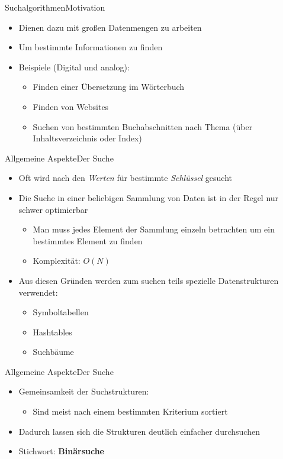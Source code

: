 \begin{frame}{Suchalgorithmen}{Motivation}
    \begin{itemize}
        \item Dienen dazu mit großen Datenmengen zu arbeiten
        \item Um bestimmte Informationen zu finden
        \item Beispiele (Digital und analog):
        \begin{itemize}
            \item Finden einer Übersetzung im Wörterbuch 
            \item Finden von Websites
            \item Suchen von bestimmten Buchabschnitten nach Thema (über Inhaltsverzeichnis oder Index)
        \end{itemize}
    \end{itemize}
\end{frame}

\begin{frame}{Allgemeine Aspekte}{Der Suche}
    \begin{itemize}
        \item Oft wird nach den \textit{Werten} für bestimmte \textit{Schlüssel} gesucht
        \item Die Suche in einer beliebigen Sammlung von Daten ist in der Regel nur schwer optimierbar
        \begin{itemize}
            \item Man muss jedes Element der Sammlung einzeln betrachten um ein bestimmtes Element zu finden
            \item Komplexität: $O(N)$
        \end{itemize}
        \item Aus diesen Gründen werden zum suchen teils spezielle Datenstrukturen verwendet:
        \begin{itemize}
            \item Symboltabellen
            \item Hashtables
            \item Suchbäume
        \end{itemize}
    \end{itemize}
\end{frame}

\begin{frame}{Allgemeine Aspekte}{Der Suche}
    \begin{itemize}
        \item Gemeinsamkeit der Suchstrukturen:
        \begin{itemize}
            \item Sind meist nach einem bestimmten Kriterium sortiert
        \end{itemize}
        \item Dadurch lassen sich die Strukturen deutlich einfacher durchsuchen
        \item Stichwort: \textbf{Binärsuche}
    \end{itemize}
\end{frame}